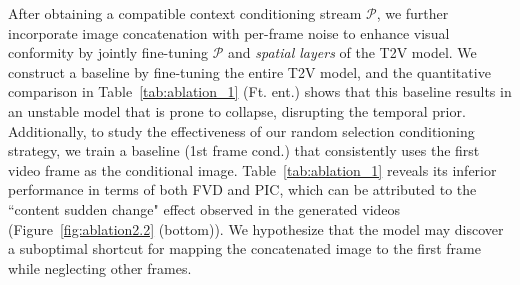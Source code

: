 After obtaining a compatible context conditioning stream $\mathcal{P}$, we further incorporate image concatenation with per-frame noise to enhance visual conformity by jointly fine-tuning $\mathcal{P}$ and \emph{spatial layers} of the T2V model. We construct a baseline by fine-tuning the entire T2V model, and the quantitative comparison in Table~\ref{tab:ablation_1} (Ft. ent.) shows that this baseline results in an unstable model that is prone to collapse, disrupting the temporal prior. Additionally, to study the effectiveness of our random selection conditioning strategy, we train a baseline (1st frame cond.) that consistently uses the first video frame as the conditional image. Table~\ref{tab:ablation_1} reveals its inferior performance in terms of both FVD and PIC, which can be attributed to the ``content sudden change" effect observed in the generated videos (Figure~\ref{fig:ablation2.2} (bottom)). We hypothesize that the model may discover a suboptimal shortcut for mapping the concatenated image to the first frame while neglecting other frames.
